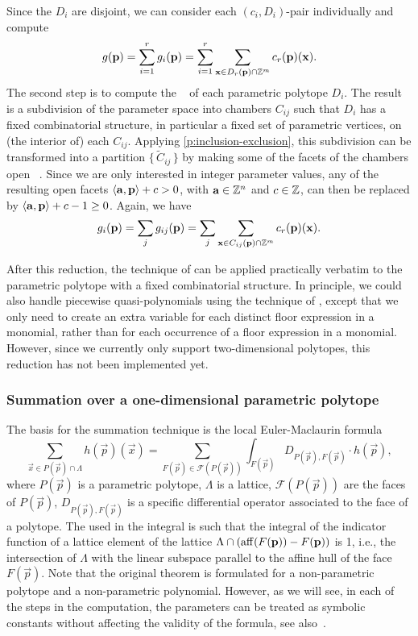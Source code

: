 Since the $D_i$ are disjoint, we can consider each
$(c_i, D_i)$-pair individually and compute
$$
g(\vec p) = \sum_{i=1}^r g_i(\vec p) =
\sum_{i=1}^r \sum_{\vec x \in D_r(\vec p) \cap \ZZ^m} c_r(\vec p)(\vec x)
.
$$
The second step is to compute the 
~ of each parametric
polytope $D_i$.
The result is a subdivision of the parameter space into chambers
$C_{ij}$ such that $D_i$ has a fixed combinatorial structure,
in particular a fixed set of parametric vertices,
on (the interior of) each $C_{ij}$.  Applying \autoref{p:inclusion-exclusion},
this subdivision can be transformed into a partition
$\{\, \tilde C_{ij} \,\}$ by
making some of the facets of the chambers open%
~.
Since we are only interested in integer parameter values,
any of the resulting open facets $\sp a p + c > 0$,
with $\vec a \in \ZZ^n$ and $c \in \mathbb{Z}$,
can then be replaced by  $\sp a p + c-1 \ge 0$.
Again, we have
$$
g_i(\vec p) = \sum_j g_{ij}(\vec p) =
\sum_j \sum_{\vec x \in C_{ij}(\vec p) \cap \ZZ^m} c_r(\vec p)(\vec x)
.
$$

After this reduction, the technique of
 can be applied practically verbatim
to the parametric polytope with a fixed combinatorial structure.
In principle, we could also handle piecewise quasi-polynomials
using the technique of ,
except that we only need to create an extra variable for each
distinct floor expression in a monomial, rather than for each
occurrence of a floor expression in a monomial.
However, since we currently only support two-dimensional polytopes,
this reduction has not been implemented yet.

\subsubsection{Summation over a one-dimensional parametric polytope}

The basis for the summation technique is the local
Euler-Maclaurin formula~\cite[Theorem~26]{Berline2006local}
\begin{equation}
\label{eq:EML}
\sum_{\vec x \in P(\vec p) \cap \Lambda} h(\vec p)(\vec x)
= \sum_{F(\vec p) \in {\mathcal F}(P(\vec p))}
	    \int_{F(\vec p)} D_{P(\vec p),F(\vec p)} \cdot h(\vec p)
,
\end{equation}
where $P(\vec p)$ is a parametric polytope,
$\Lambda$ is a lattice, ${\mathcal F}(P(\vec p))$
are the faces of $P(\vec p)$, $D_{P(\vec p),F(\vec p)}$ is a
specific differential operator associated to the face of a polytope.
The  used in the integral is such that the
integral of the indicator function of a lattice element of
the lattice $\Lambda \cap (\affhull(F(\vec p)) - F(\vec p))$ is 1,
i.e., the intersection of $\Lambda$ with the linear subspace
parallel to the affine hull of the face $F(\vec p)$.
Note that the original theorem is formulated for a non-parametric
polytope and a non-parametric polynomial.  However, as we will see,
in each of the steps in the computation, the parameters can be
treated as symbolic constants without affecting the validity of the formula,
see also~.


